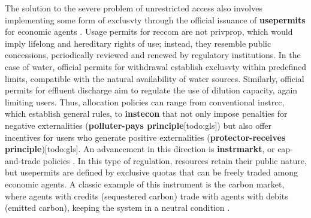 \documentclass[./main_en.tex]{subfiles}
\begin{document}
\par The solution to the severe problem of unrestricted access also involves implementing some form of \gls{exclusvty} through the official issuance of \textbf{\gls{usepermits}} for economic agents \cite{Schlager1992}. Usage permits for \gls{reccom} are not \gls{privprop}, which would imply lifelong and hereditary rights of use; instead, they resemble public concessions, periodically reviewed and renewed by regulatory institutions. In the case of water, official permits for withdrawal establish \gls{exclusvty} within predefined limits, compatible with the natural availability of water sources. Similarly, official permits for effluent discharge aim to regulate the use of dilution capacity, again limiting users. Thus, allocation policies can range from conventional \gls{instrcc}, which establish general rules, to \textbf{\gls{instecon}} that not only impose penalties for negative externalities (\textbf{polluter-pays principle}[todo:gls]) but also offer incentives for users who generate positive externalities (\textbf{protector-receives principle})[todo:gls]. An advancement in this direction is \textbf{\gls{instrmarkt}}, or cap-and-trade policies \cite{Borghesi2013}. In this type of regulation, resources retain their public nature, but \gls{usepermits} are defined by exclusive quotas that can be freely traded among economic agents. A classic example of this instrument is the carbon market, where agents with credits (sequestered carbon) trade with agents with debits (emitted carbon), keeping the \gls{system} in a neutral condition \cite{Mazaheri2022}.
\end{document}
